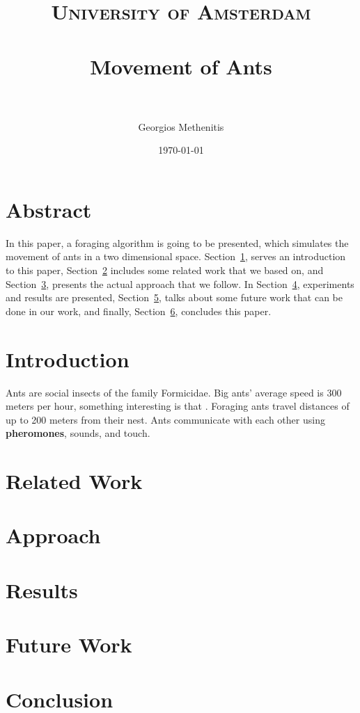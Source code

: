 \documentclass[paper=a4, fontsize=11pt]{scrartcl} %
\title{	
\normalfont \normalsize 
\textsc{University of Amsterdam} \\ [25pt] %
\horrule{0.5pt} \\[0.4cm] %
\huge Movement of Ants \\ %
\horrule{2pt} \\[0.5cm] %
}
\author{Georgios Methenitis} %
\date{\normalsize\today} %
\numberwithin{equation}{section} %
\numberwithin{figure}{section} %
\numberwithin{table}{section} %
\begin{document}
\maketitle %

\section*{Abstract}
In this paper, a foraging algorithm is going to be presented, which simulates the movement of ants in a two dimensional space. Section~\ref{intro}, serves an introduction to this paper, Section~\ref{related} includes some related work that we based on, and Section~\ref{approach}, presents the actual approach that we follow. In Section~\ref{results}, experiments and results are presented, Section~\ref{future}, talks about some future work that can be done in our work, and finally, Section~\ref{conclusion}, concludes this paper.


\section{Introduction}
\label{intro}
Ants are social insects of the family Formicidae. Big ants' average speed is 300 meters per hour, something interesting is that .
Foraging ants travel distances of up to 200 meters from their nest.
Ants communicate with each other using \textbf{pheromones}, sounds, and touch.

\section{Related Work}
\label{related}

\section{Approach}
\label{approach}

\section{Results}
\label{results}

\section{Future Work}
\label{future}

\section{Conclusion}
\label{conclusion}
\end{document}
